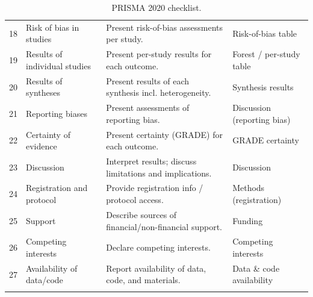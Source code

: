 \documentclass[11pt]{article}
\begin{document}
\begin{longtable}{c p{3.2cm} p{6.0cm} p{3.2cm}}
18 & Risk of bias in studies & Present risk-of-bias assessments per study. & Risk-of-bias table \\
19 & Results of individual studies & Present per-study results for each outcome. & Forest / per-study table \\
20 & Results of syntheses & Present results of each synthesis incl. heterogeneity. & Synthesis results \\
21 & Reporting biases & Present assessments of reporting bias. & Discussion (reporting bias) \\
22 & Certainty of evidence & Present certainty (GRADE) for each outcome. & GRADE certainty \\
23 & Discussion & Interpret results; discuss limitations and implications. & Discussion \\
24 & Registration and protocol & Provide registration info / protocol access. & Methods (registration) \\
25 & Support & Describe sources of financial/non-financial support. & Funding \\
26 & Competing interests & Declare competing interests. & Competing interests \\
27 & Availability of data/code & Report availability of data, code, and materials. & Data \& code availability \\
\bottomrule
\caption{PRISMA 2020 checklist.}
\end{longtable}



\end{document}
